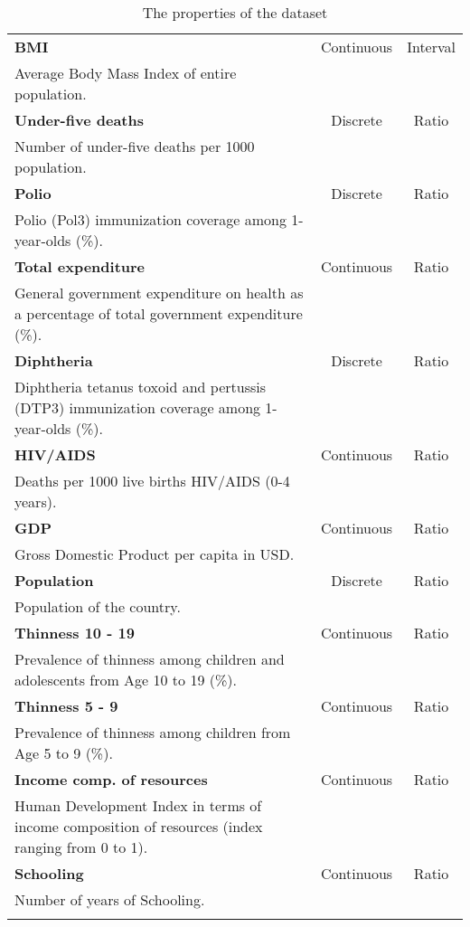 \documentclass{article}
\begin{document}
\begin{longtable}[htbp]{p{8cm}cc}
  \textbf{BMI} & Continuous & Interval \\ Average Body Mass Index of entire population. \\[\rowsep]
  \textbf{Under-five deaths} & Discrete & Ratio \\ Number of under-five deaths per 1000 population. \\[\rowsep]
  \textbf{Polio} & Discrete & Ratio \\ Polio (Pol3) immunization coverage among 1-year-olds (\%). \\[\rowsep]
  \textbf{Total expenditure} & Continuous & Ratio \\ General government expenditure on health as a percentage of total government expenditure (\%). \\[\rowsep]
  \textbf{Diphtheria} & Discrete & Ratio \\ Diphtheria tetanus toxoid and pertussis (DTP3) immunization coverage among 1-year-olds (\%). \\[\rowsep]
  \textbf{HIV/AIDS} & Continuous & Ratio \\ Deaths per 1000 live births HIV/AIDS (0-4 years). \\[\rowsep]
  \textbf{GDP} & Continuous & Ratio \\ Gross Domestic Product per capita in USD. \\[\rowsep]
  \textbf{Population} & Discrete & Ratio \\ Population of the country. \\[\rowsep]
  \textbf{Thinness 10 - 19} & Continuous & Ratio \\ Prevalence of thinness among children and adolescents from Age 10 to 19 (\%). \\[\rowsep]
  \textbf{Thinness 5 - 9} & Continuous & Ratio \\ Prevalence of thinness among children from Age 5 to 9 (\%). \\[\rowsep]
  \textbf{Income comp. of resources} & Continuous & Ratio \\ Human Development Index in terms of income composition of resources (index ranging from 0 to 1). \\[\rowsep]
  \textbf{Schooling} & Continuous & Ratio \\ Number of years of Schooling. \\[\rowsep]
  \caption{The properties of the dataset} \label{tab:my_table} \\
\end{longtable}

\end{document}
